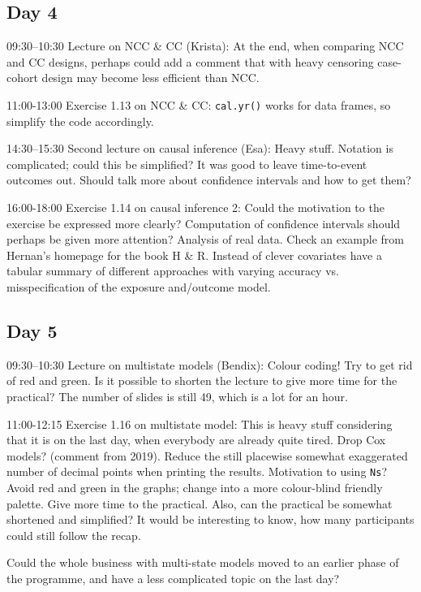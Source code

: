 \documentclass[11pt,a4]{article}
\begin{document}
\subsection*{Day 4}

09:30--10:30 Lecture on NCC \& CC (Krista): 
At the end, when comparing NCC and CC designs, perhaps could add a comment that with heavy 
censoring case-cohort design may become less efficient than NCC.

11:00-13:00 Exercise 1.13 on NCC \& CC: {\tt cal.yr()} works for data frames, so simplify the code accordingly.

14:30--15:30 Second lecture on causal inference (Esa):
 Heavy stuff. Notation is complicated; could this be simplified?
It was good to leave time-to-event outcomes out. 
Should talk more about confidence intervals and how to get them?

16:00-18:00 Exercise 1.14 on causal inference 2: 
Could the motivation to the exercise be expressed more clearly?
Computation of confidence intervals should perhaps be given more attention?
Analysis of real data. Check an example from Hernan's homepage
for the book H \& R.
Instead of clever covariates have a tabular 
summary of different approaches with varying accuracy 
vs. misspecification of the exposure and/outcome model.

\subsection*{Day 5}

09:30--10:30 Lecture on multistate models (Bendix): 
Colour coding! Try to get rid of red and green. 
 Is it possible to shorten the lecture to give more time for the practical? 
The number of slides is still 49, which is a lot for an hour. 

11:00-12:15 Exercise 1.16 on multistate model:
This is heavy stuff considering that it is on the last day,
when everybody are already quite tired. Drop Cox models? (comment from 2019). 
Reduce the still placewise somewhat exaggerated number of decimal points when printing the results.
Motivation to using \texttt{Ns}? 
Avoid red and green in the graphs; change into a more colour-blind friendly palette. 
Give more time to the practical. 
Also, can the practical be somewhat shortened and simplified?
It would be interesting to know, how many participants could still
follow the recap.

Could the whole business with multi-state models moved to an earlier phase of the
programme, and have a less complicated topic on the last day?
\end{document}
